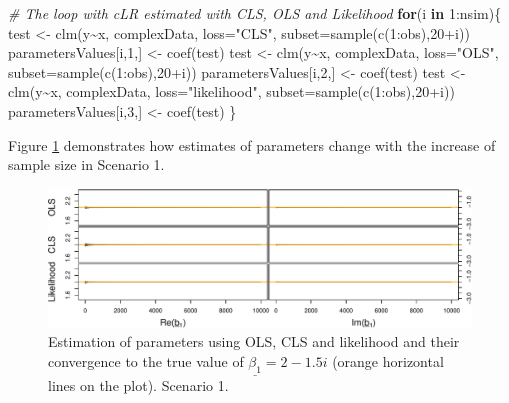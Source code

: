 \documentclass[
]{book}
\newenvironment{Shaded}{\begin{snugshade}}{\end{snugshade}}
\newcommand{\AttributeTok}[1]{\textcolor[rgb]{0.77,0.63,0.00}{#1}}
\newcommand{\CommentTok}[1]{\textcolor[rgb]{0.56,0.35,0.01}{\textit{#1}}}
\newcommand{\ControlFlowTok}[1]{\textcolor[rgb]{0.13,0.29,0.53}{\textbf{#1}}}
\newcommand{\DecValTok}[1]{\textcolor[rgb]{0.00,0.00,0.81}{#1}}
\newcommand{\FunctionTok}[1]{\textcolor[rgb]{0.00,0.00,0.00}{#1}}
\newcommand{\NormalTok}[1]{#1}
\newcommand{\OtherTok}[1]{\textcolor[rgb]{0.56,0.35,0.01}{#1}}
\newcommand{\SpecialCharTok}[1]{\textcolor[rgb]{0.00,0.00,0.00}{#1}}
\newcommand{\StringTok}[1]{\textcolor[rgb]{0.31,0.60,0.02}{#1}}
\begin{document}
\begin{Shaded}
\begin{Highlighting}[]
\CommentTok{\# The loop with cLR estimated with CLS, OLS and Likelihood}
\ControlFlowTok{for}\NormalTok{(i }\ControlFlowTok{in} \DecValTok{1}\SpecialCharTok{:}\NormalTok{nsim)\{}
\NormalTok{    test }\OtherTok{\textless{}{-}} \FunctionTok{clm}\NormalTok{(y}\SpecialCharTok{\textasciitilde{}}\NormalTok{x, complexData, }\AttributeTok{loss=}\StringTok{"CLS"}\NormalTok{,}
                \AttributeTok{subset=}\FunctionTok{sample}\NormalTok{(}\FunctionTok{c}\NormalTok{(}\DecValTok{1}\SpecialCharTok{:}\NormalTok{obs),}\DecValTok{20}\SpecialCharTok{+}\NormalTok{i))}
\NormalTok{    parametersValues[i,}\DecValTok{1}\NormalTok{,] }\OtherTok{\textless{}{-}} \FunctionTok{coef}\NormalTok{(test)}
\NormalTok{    test }\OtherTok{\textless{}{-}} \FunctionTok{clm}\NormalTok{(y}\SpecialCharTok{\textasciitilde{}}\NormalTok{x, complexData, }\AttributeTok{loss=}\StringTok{"OLS"}\NormalTok{,}
                \AttributeTok{subset=}\FunctionTok{sample}\NormalTok{(}\FunctionTok{c}\NormalTok{(}\DecValTok{1}\SpecialCharTok{:}\NormalTok{obs),}\DecValTok{20}\SpecialCharTok{+}\NormalTok{i))}
\NormalTok{    parametersValues[i,}\DecValTok{2}\NormalTok{,] }\OtherTok{\textless{}{-}} \FunctionTok{coef}\NormalTok{(test)}
\NormalTok{    test }\OtherTok{\textless{}{-}} \FunctionTok{clm}\NormalTok{(y}\SpecialCharTok{\textasciitilde{}}\NormalTok{x, complexData, }\AttributeTok{loss=}\StringTok{"likelihood"}\NormalTok{,}
                \AttributeTok{subset=}\FunctionTok{sample}\NormalTok{(}\FunctionTok{c}\NormalTok{(}\DecValTok{1}\SpecialCharTok{:}\NormalTok{obs),}\DecValTok{20}\SpecialCharTok{+}\NormalTok{i))}
\NormalTok{    parametersValues[i,}\DecValTok{3}\NormalTok{,] }\OtherTok{\textless{}{-}} \FunctionTok{coef}\NormalTok{(test)}
\NormalTok{\}}
\end{Highlighting}
\end{Shaded}

Figure \ref{fig:parametersUCDV} demonstrates how estimates of parameters change with the increase of sample size in Scenario 1.

\begin{figure}
\centering
\includegraphics{Svetunkov---Svetunkov---Complex-Valued-Econometrics_files/figure-latex/parametersUCDV-1.pdf}
\caption{\label{fig:parametersUCDV}Estimation of parameters using OLS, CLS and likelihood and their convergence to the true value of \(\underline{\beta_1}=2-1.5i\) (orange horizontal lines on the plot). Scenario 1.}
\end{figure}
\end{document}
